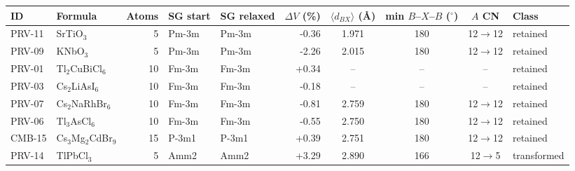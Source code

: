 \begin{tabular}{@{}llrllrcccl@{}}\toprule
ID & Formula & Atoms & SG start & SG relaxed & $\Delta V$ (\%) & $\langle d_{BX}\rangle$ (\AA) & min $B$--$X$--$B$ ($^\circ$) & $A$ CN & Class\\\midrule
PRV-11 & SrTiO$_{3}$ & 5 & Pm-3m & Pm-3m & -0.36 & 1.971 & 180 & 12$\to$12 & retained \\
PRV-09 & KNbO$_{3}$ & 5 & Pm-3m & Pm-3m & -2.26 & 2.015 & 180 & 12$\to$12 & retained \\
PRV-01 & Tl$_{2}$CuBiCl$_{6}$ & 10 & Fm-3m & Fm-3m & +0.34 & -- & -- & -- & retained \\
PRV-03 & Cs$_{2}$LiAsI$_{6}$ & 10 & Fm-3m & Fm-3m & -0.18 & -- & -- & -- & retained \\
PRV-07 & Cs$_{2}$NaRhBr$_{6}$ & 10 & Fm-3m & Fm-3m & -0.81 & 2.759 & 180 & 12$\to$12 & retained \\
PRV-06 & Tl$_{3}$AsCl$_{6}$ & 10 & Fm-3m & Fm-3m & -0.55 & 2.750 & 180 & 12$\to$12 & retained \\
CMB-15 & Cs$_{3}$Mg$_{2}$CdBr$_{9}$ & 15 & P-3m1 & P-3m1 & +0.39 & 2.751 & 180 & 12$\to$12 & retained \\
PRV-14 & TlPbCl$_{3}$ & 5 & Amm2 & Amm2 & +3.29 & 2.890 & 166 & 12$\to$5 & transformed \\
\bottomrule\end{tabular}
